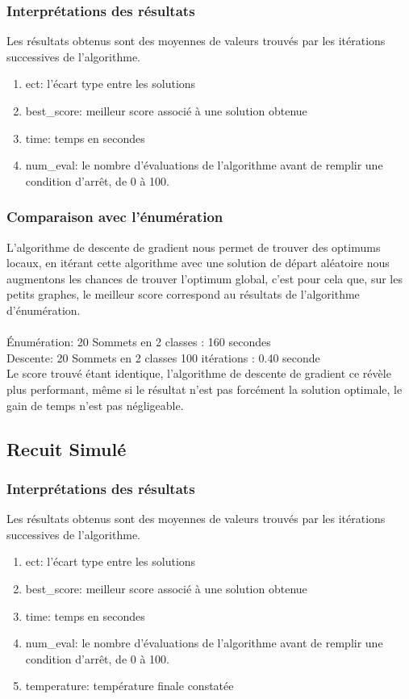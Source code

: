 \documentclass[a4paper]{article}
\begin{document}
		\subsubsection{Interprétations des résultats}
		Les résultats obtenus sont des moyennes de valeurs trouvés par les itérations successives de l'algorithme.\\
		\begin{enumerate}
			\item{ect}: l'écart type entre les solutions
			\item{best\_score}: meilleur score associé à une solution obtenue
			\item{time}: temps en secondes
			\item{num\_eval}: le nombre d'évaluations de l'algorithme avant de remplir une condition d'arrêt, de 0 à 100.
		\end{enumerate}

		\subsubsection{Comparaison avec l'énumération}
		L'algorithme de descente de gradient nous permet de trouver des optimums locaux, en itérant cette algorithme avec une solution de départ aléatoire nous augmentons les chances de trouver l'optimum global, c'est pour cela que, sur les petits graphes, le meilleur score correspond au résultats de l'algorithme d'énumération.\\\\
		Énumération: 20 Sommets en 2 classes : 160 secondes\\
		Descente: 20 Sommets en 2 classes 100 itérations : 0.40 seconde\\

		Le score trouvé étant identique, l'algorithme de descente de gradient ce révèle plus performant, même si le résultat n'est pas forcément la solution optimale, le gain de temps n'est pas négligeable.\\

	\subsection{Recuit Simulé}
		\subsubsection{Interprétations des résultats}
			Les résultats obtenus sont des moyennes de valeurs trouvés par les itérations successives de l'algorithme.\\
			\begin{enumerate}
				\item{ect}: l'écart type entre les solutions
				\item{best\_score}: meilleur score associé à une solution obtenue
				\item{time}: temps en secondes
				\item{num\_eval}: le nombre d'évaluations de l'algorithme avant de remplir une condition d'arrêt, de 0 à 100.
				\item{temperature}: température finale constatée
			\end{enumerate}
\end{document}
